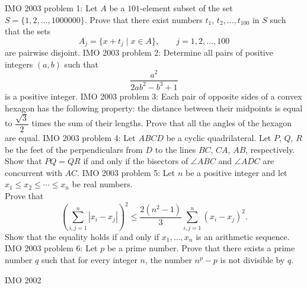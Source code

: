 IMO 2003 problem 1:  Let $A$ be a $101$-element subset of the set $S=\{1,2,\ldots,1000000\}$. Prove that there exist numbers $t_1$, $t_2, \ldots, t_{100}$ in $S$ such that the sets
\[ A_j=\{x+t_j\mid x\in A\},\qquad j=1,2,\ldots,100 \]
are pairwise disjoint. 
IMO 2003 problem 2:  Determine all pairs of positive integers $(a,b)$ such that
\[ \dfrac{a^2}{2ab^2-b^3+1} \]
is a positive integer. 
IMO 2003 problem 3:  Each pair of opposite sides of a convex hexagon has the following property: the distance between their midpoints is equal to  $\dfrac{\sqrt{3}}{2}$ times the sum of their lengths. Prove that all the angles of the hexagon are equal. 
IMO 2003 problem 4:  Let $ABCD$ be a cyclic quadrilateral. Let $P$, $Q$, $R$ be the feet of the perpendiculars from $D$ to the lines $BC$, $CA$, $AB$, respectively. Show that $PQ=QR$ if and only if the bisectors of $\angle ABC$ and $\angle ADC$ are concurrent with $AC$. 
IMO 2003 problem 5:  Let $n$ be a positive integer and let $x_1\le x_2\le\cdots\le x_n$ be real numbers. \\
Prove that
\[ \left(\sum_{i,j=1}^n|x_i-x_j|\right)^2\le\frac{2(n^2-1)}{3}\sum_{i,j=1}^n(x_i-x_j)^2. \]
Show that the equality holds if and only if $x_1, \ldots, x_n$ is an arithmetic sequence. 
IMO 2003 problem 6:  Let $p$ be a prime number. Prove that there exists a prime number $q$ such that for every integer $n$, the number $n^p-p$ is not divisible by $q$. 

IMO 2002 

